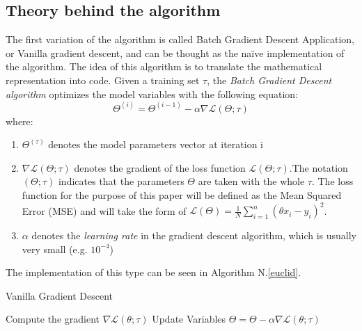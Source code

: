 \documentclass[conference]{IEEEtran}
\begin{document}
\subsection{Theory behind the algorithm}
The first variation of the algorithm is called Batch Gradient Descent Application, or Vanilla gradient descent, and can be thought as the naïve implementation of the algorithm.\cite{JZ2019} 
The idea of this algorithm is to translate the mathematical representation into code. 
Given a training set $\tau$, the \textit{Batch Gradient Descent algorithm} optimizes the model variables with the following equation:
\begin{equation}
    \Theta^{(i)} = \Theta^{(i-1)} -\alpha\nabla\mathscr{L}(\Theta;\tau)\label{BGDA}
\end{equation}
where:
\begin{enumerate}
  \item $\Theta^{(\tau)}$ denotes the model parameters vector at iteration i
  \item $\nabla\mathscr{L}(\Theta;\tau)$ denotes the gradient of the loss function $\mathscr{L}(\Theta;\tau)$.The notation $(\Theta;\tau)$ indicates that the parameters $\Theta$ are taken with the whole $\tau$. The loss function for the purpose of this paper will be defined as the Mean Squared Error (MSE) and will take the form of $\mathscr{L}(\Theta)= \frac{1}{N}\sum_{i=1}^{n}(\theta x_i - y_i)^2$.
  \item $\alpha$ denotes the  \textit{learning rate} in the gradient descent algorithm, which is usually very small (e.g. $10^{-4}$)
\end{enumerate}

The implementation of this type can be seen in Algorithm N.\ref{euclid}.

\begin{algorithm}
\caption{Vanilla Gradient Descent}\label{euclid}
\begin{algorithmic}[1]
\State Compute the gradient $\nabla\mathscr{L}(\theta;\tau)$
\State Update Variables $\Theta = \Theta -\alpha\nabla\mathscr{L}(\theta;\tau)$
\EndFor
{}
\end{algorithmic}
\end{algorithm}
\end{document}
